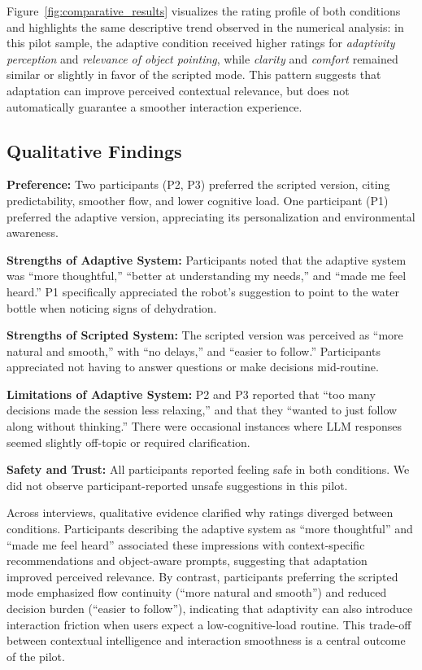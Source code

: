 \documentclass[pdflatex,sn-basic,Numbered,iicol,twocolumn]{sn-jnl}%
\begin{document}
Figure~\ref{fig:comparative_results} visualizes the rating profile of both conditions and highlights the same descriptive trend observed in the numerical analysis: in this pilot sample, the adaptive condition received higher ratings for \textit{adaptivity perception} and \textit{relevance of object pointing}, while \textit{clarity} and \textit{comfort} remained similar or slightly in favor of the scripted mode. This pattern suggests that adaptation can improve perceived contextual relevance, but does not automatically guarantee a smoother interaction experience.

\subsection{Qualitative Findings}

\textbf{Preference:} Two participants (P2, P3) preferred the scripted version, citing predictability, smoother flow, and lower cognitive load. One participant (P1) preferred the adaptive version, appreciating its personalization and environmental awareness.

\textbf{Strengths of Adaptive System:} Participants noted that the adaptive system was ``more thoughtful,'' ``better at understanding my needs,'' and ``made me feel heard.'' P1 specifically appreciated the robot's suggestion to point to the water bottle when noticing signs of dehydration.

\textbf{Strengths of Scripted System:} The scripted version was perceived as ``more natural and smooth,'' with ``no delays,'' and ``easier to follow.'' Participants appreciated not having to answer questions or make decisions mid-routine.

\textbf{Limitations of Adaptive System:} P2 and P3 reported that ``too many decisions made the session less relaxing,'' and that they ``wanted to just follow along without thinking.'' There were occasional instances where LLM responses seemed slightly off-topic or required clarification.

\textbf{Safety and Trust:} All participants reported feeling safe in both conditions. We did not observe participant-reported unsafe suggestions in this pilot.

Across interviews, qualitative evidence clarified why ratings diverged between conditions. Participants describing the adaptive system as ``more thoughtful'' and ``made me feel heard'' associated these impressions with context-specific recommendations and object-aware prompts, suggesting that adaptation improved perceived relevance. By contrast, participants preferring the scripted mode emphasized flow continuity (``more natural and smooth'') and reduced decision burden (``easier to follow''), indicating that adaptivity can also introduce interaction friction when users expect a low-cognitive-load routine. This trade-off between contextual intelligence and interaction smoothness is a central outcome of the pilot.
\end{document}
